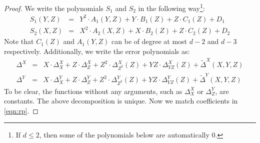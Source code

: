 \begin{proof}
We write the polynomials $S_1$ and $S_2$ in the following way\footnote{If $d\leq 2$, then some of the polynomials below are automatically $0$.}:
	\begin{eqnarray*}
	S_1(Y,Z) &=& Y^2 \cdot A_{1}(Y,Z) + Y \cdot B_1(Z) + Z \cdot C_1(Z) + D_1 \\
	S_2(X,Z) &=& X^2\cdot A_{2}(X,Z) + X\cdot B_2(Z) + Z\cdot C_2(Z) + D_2
	\end{eqnarray*}
Note that $C_1(Z)$ and $A_1(Y,Z)$ can be of degree at most $d-2$ and $d-3$ respectively. Additionally, we write the error polynomials as:	
	\begin{eqnarray*}
	\Delta^X &=& X\cdot \Delta^X_X + Z\cdot \Delta^X_Z + Z^2\cdot \Delta^X_{Z^2}(Z) + YZ\cdot \Delta^X_{YZ}(Z) + \tilde{\Delta}^X(X,Y,Z) \\
	\Delta^Y &=& X\cdot \Delta^Y_X + Z\cdot \Delta^Y_Z + Z^2\cdot \Delta^Y_{Z^2}(Z) + YZ\cdot \Delta^Y_{YZ}(Z) + \tilde{\Delta}^Y(X,Y,Z)
	\end{eqnarray*}
To be clear, the functions without any arguments, such as $\Delta^X_X$ or $\Delta^Y_Z$, are constants. The above decomposition is unique.
 Now we match coefficients in \eqref{eqn:rp}. 
	

\end{proof}
